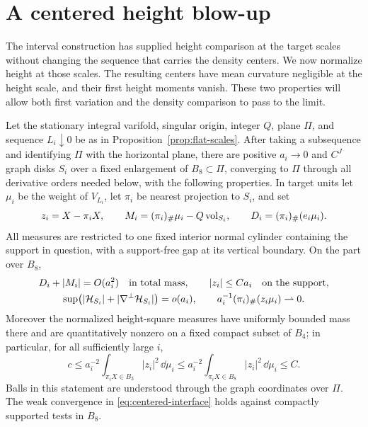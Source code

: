 \section{A centered height blow-up}\label{sec:centered-blowup}

The interval construction has supplied height comparison at the target
scales without changing the sequence that carries the density centers.
We now normalize height at those scales. The resulting centers have
mean curvature negligible at the height scale, and their first height
moments vanish. These two properties will allow both first variation
and the density comparison to pass to the limit.

\begin{proposition}
\label{prop:centered-blowup}
Let the stationary integral varifold, singular origin, integer $Q$,
plane $\Pi$, and sequence $L_i\downarrow0$ be as in
Proposition~\ref{prop:flat-scales}. After taking a subsequence and
identifying $\Pi$ with the horizontal plane, there are positive
$a_i\to0$ and $C^J$ graph disks $S_i$ over a fixed enlargement of
$B_8\subset\Pi$, converging to $\Pi$ through all derivative orders
needed below, with the following properties. In target units let
$\mu_i$ be the weight of $V_{L_i}$, let $\pi_i$ be nearest projection
to $S_i$, and set
\[
 z_i=X-\pi_iX,\qquad
 M_i=(\pi_i)_\#\mu_i-Q\operatorname{vol}_{S_i},\qquad
 D_i=(\pi_i)_\#(e_i\mu_i).
\]
All measures are restricted to one fixed interior normal cylinder
containing the support in question, with a support-free gap at its
vertical boundary. On the part over $B_8$,
\begin{equation}\label{eq:centered-interface}
 \begin{gathered}
 D_i+|M_i|=O(a_i^2)\quad\hbox{in total mass},
 \qquad |z_i|\le Ca_i\quad\hbox{on the support},\\
 \sup\bigl(|\mathcal H_{S_i}|+
                  |\nabla^\perp\mathcal H_{S_i}|\bigr)=o(a_i),
 \qquad
 a_i^{-1}(\pi_i)_\#(z_i\mu_i)\rightharpoonup0.
 \end{gathered}
\end{equation}
Moreover the normalized height-square measures have uniformly bounded
mass there and are quantitatively nonzero on a fixed compact subset
of $B_4$; in particular, for all sufficiently large $i$,
\begin{equation}\label{eq:nonzero-second-moment}
 c\le a_i^{-2}\int_{\pi_iX\in B_3}|z_i|^2\,\dd\mu_i
 \le a_i^{-2}\int_{\pi_iX\in B_8}|z_i|^2\,\dd\mu_i\le C.
\end{equation}
Balls in this statement are understood through the graph coordinates
over $\Pi$. The weak convergence in \eqref{eq:centered-interface}
holds against compactly supported tests in $B_8$.
\end{proposition}

